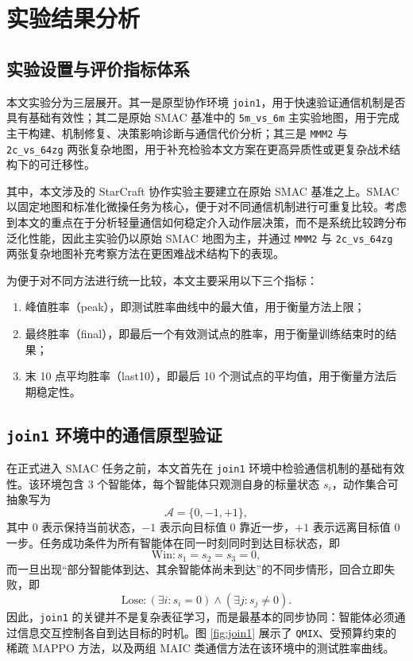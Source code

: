 \chapter{实验结果分析}

\section{实验设置与评价指标体系}

本文实验分为三层展开。其一是原型协作环境 \texttt{join1}，用于快速验证通信机制是否具有基础有效性；其二是原始 SMAC 基准中的 \texttt{5m\_vs\_6m} 主实验地图，用于完成主干构建、机制修复、决策影响诊断与通信代价分析；其三是 \texttt{MMM2} 与 \texttt{2c\_vs\_64zg} 两张复杂地图，用于补充检验本文方案在更高异质性或更复杂战术结构下的可迁移性。

其中，本文涉及的 StarCraft 协作实验主要建立在原始 SMAC 基准之上\cite{samvelyan19smac}。SMAC 以固定地图和标准化微操任务为核心，便于对不同通信机制进行可重复比较。考虑到本文的重点在于分析轻量通信如何稳定介入动作层决策，而不是系统比较跨分布泛化性能，因此主实验仍以原始 SMAC 地图为主，并通过 \texttt{MMM2} 与 \texttt{2c\_vs\_64zg} 两张复杂地图补充考察方法在更困难战术结构下的表现。

为便于对不同方法进行统一比较，本文主要采用以下三个指标：
\begin{enumerate}
    \item 峰值胜率（peak），即测试胜率曲线中的最大值，用于衡量方法上限；
    \item 最终胜率（final），即最后一个有效测试点的胜率，用于衡量训练结束时的结果；
    \item 末 10 点平均胜率（last10），即最后 10 个测试点的平均值，用于衡量方法后期稳定性。
\end{enumerate}

\section{\texttt{join1} 环境中的通信原型验证}

在正式进入 SMAC 任务之前，本文首先在 \texttt{join1} 环境中检验通信机制的基础有效性。该环境包含 3 个智能体，每个智能体只观测自身的标量状态 $s_i$，动作集合可抽象写为
\begin{equation}
\mathcal{A}=\{0,-1,+1\},
\end{equation}
其中 $0$ 表示保持当前状态，$-1$ 表示向目标值 $0$ 靠近一步，$+1$ 表示远离目标值 $0$ 一步。任务成功条件为所有智能体在同一时刻同时到达目标状态，即
\begin{equation}
\text{Win}: s_1=s_2=s_3=0,
\end{equation}
而一旦出现“部分智能体到达、其余智能体尚未到达”的不同步情形，回合立即失败，即
\begin{equation}
\text{Lose}: (\exists i:s_i=0)\wedge(\exists j:s_j\neq0).
\end{equation}
因此，\texttt{join1} 的关键并不是复杂表征学习，而是最基本的同步协同：智能体必须通过信息交互控制各自到达目标的时机。图 \ref{fig:join1} 展示了 \texttt{QMIX}、受预算约束的稀疏 MAPPO 方法，以及两组 MAIC 类通信方法在该环境中的测试胜率曲线。


